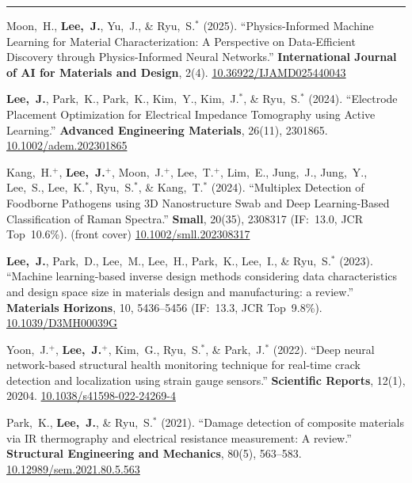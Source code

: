 \documentclass[11pt, a4paper]{article}
\newenvironment{cvsec}[1]{%
  \par\vspace{0.9em}%
  \noindent{\large\bfseries #1}\par\nobreak%
  \vspace{2pt}%
  \noindent\rule{\linewidth}{0.4pt}\par\nobreak%
  \vspace{3pt}%
  \noindent%
}{%
  \vspace{2pt}%
}
\newenvironment{pubrev}[1]{%
  \begin{etaremune}[leftmargin=2em, itemsep=5pt, parsep=0pt, topsep=0pt, partopsep=0pt, start=#1]%
}{%
  \end{etaremune}%
}
\begin{document}
\begin{cvsec}{Publications}
\begin{pubrev}{18}
\item Moon,~H., \textbf{Lee,~J.}, Yu,~J., \& Ryu,~S.$^*$ (2025).
``Physics-Informed Machine Learning for Material Characterization: A Perspective on Data-Efficient Discovery through Physics-Informed Neural Networks.''
\textbf{International Journal of AI for Materials and Design}, 2(4).
\href{https://doi.org/10.36922/IJAMD025440043}{10.36922/IJAMD025440043}

\item \textbf{Lee,~J.}, Park,~K., Park,~K., Kim,~Y., Kim,~J.$^*$, \& Ryu,~S.$^*$ (2024).
``Electrode Placement Optimization for Electrical Impedance Tomography using Active Learning.''
\textbf{Advanced Engineering Materials}, 26(11), 2301865.
\href{https://doi.org/10.1002/adem.202301865}{10.1002/adem.202301865}

\item Kang,~H.$^+$, \textbf{Lee,~J.}$^+$, Moon,~J.$^+$, Lee,~T.$^+$, Lim,~E., Jung,~J., Jung,~Y., Lee,~S., Lee,~K.$^*$, Ryu,~S.$^*$, \& Kang,~T.$^*$ (2024).
``Multiplex Detection of Foodborne Pathogens using 3D Nanostructure Swab and Deep Learning-Based Classification of Raman Spectra.''
\textbf{Small}, 20(35), 2308317 (IF:~13.0, JCR Top~10.6\%). (front cover)
\href{https://doi.org/10.1002/smll.202308317}{10.1002/smll.202308317}

\item \textbf{Lee,~J.}, Park,~D., Lee,~M., Lee,~H., Park,~K., Lee,~I., \& Ryu,~S.$^*$ (2023).
``Machine learning-based inverse design methods considering data characteristics and design space size in materials design and manufacturing: a review.''
\textbf{Materials Horizons}, 10, 5436--5456 (IF:~13.3, JCR Top~9.8\%).
\href{https://doi.org/10.1039/D3MH00039G}{10.1039/D3MH00039G}

\item Yoon,~J.$^+$, \textbf{Lee,~J.}$^+$, Kim,~G., Ryu,~S.$^*$, \& Park,~J.$^*$ (2022).
``Deep neural network-based structural health monitoring technique for real-time crack detection and localization using strain gauge sensors.''
\textbf{Scientific Reports}, 12(1), 20204.
\href{https://doi.org/10.1038/s41598-022-24269-4}{10.1038/s41598-022-24269-4}

\item Park,~K., \textbf{Lee,~J.}, \& Ryu,~S.$^*$ (2021).
``Damage detection of composite materials via IR thermography and electrical resistance measurement: A review.''
\textbf{Structural Engineering and Mechanics}, 80(5), 563--583.
\href{https://doi.org/10.12989/sem.2021.80.5.563}{10.12989/sem.2021.80.5.563}


\end{pubrev}
\end{cvsec}
\end{document}
